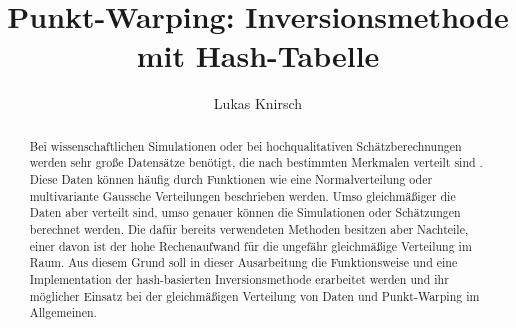 \documentclass[a4paper]{IEEEtran}
\title{Punkt-Warping: Inversionsmethode mit Hash-Tabelle}
\author{Lukas Knirsch}
\begin{document}
\maketitle

\begin{abstract}
Bei wissenschaftlichen Simulationen oder bei hochqualitativen Schätzberechnungen werden sehr große Datensätze benötigt, 
die nach bestimmten Merkmalen verteilt sind \cite{frisch_hanebeck-deterministic_gaussian_sampling-2021}. Diese Daten können häufig durch Funktionen wie eine Normalverteilung oder 
multivariante Gaussche Verteilungen beschrieben werden. Umso gleichmäßiger die Daten aber verteilt sind, umso genauer  
können die Simulationen oder Schätzungen berechnet werden. Die dafür bereits verwendeten Methoden besitzen aber Nachteile, 
einer davon ist der hohe Rechenaufwand für die ungefähr gleichmäßige Verteilung im Raum. Aus diesem Grund soll in dieser 
Ausarbeitung die Funktionsweise und eine Implementation der hash-basierten Inversionsmethode erarbeitet werden und ihr 
möglicher Einsatz bei der gleichmäßigen Verteilung von Daten und Punkt-Warping im Allgemeinen.
\end{abstract}

















\end{document}
